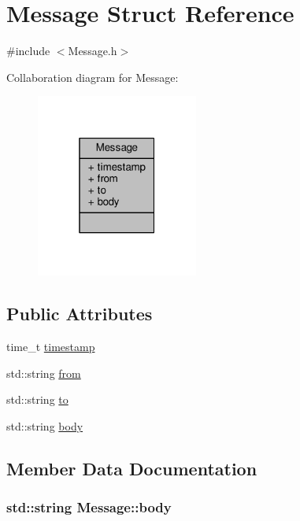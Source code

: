 \hypertarget{structMessage}{}\section{Message Struct Reference}
\label{structMessage}


{\ttfamily \#include $<$Message.\+h$>$}



Collaboration diagram for Message\+:
\nopagebreak
\begin{figure}[H]
\begin{center}
\leavevmode
\includegraphics[width=151pt]{structMessage__coll__graph}
\end{center}
\end{figure}
\subsection*{Public Attributes}
\begin{DoxyCompactItemize}
\item 
time\+\_\+t \hyperlink{structMessage_a23d8be7ab171d014f7286587b8d1c16b}{timestamp}
\item 
std\+::string \hyperlink{structMessage_a9d1b7342dff5fedbef018e9517820263}{from}
\item 
std\+::string \hyperlink{structMessage_a094146d3f34095c1ab1395cd06c91c06}{to}
\item 
std\+::string \hyperlink{structMessage_a4e543f4898ab8a7c812caab2c21bfab7}{body}
\end{DoxyCompactItemize}


\subsection{Member Data Documentation}
\subsubsection[{\texorpdfstring{body}{body}}]{\setlength{\rightskip}{0pt plus 5cm}std\+::string Message\+::body}\hypertarget{structMessage_a4e543f4898ab8a7c812caab2c21bfab7}{}\label{structMessage_a4e543f4898ab8a7c812caab2c21bfab7}
